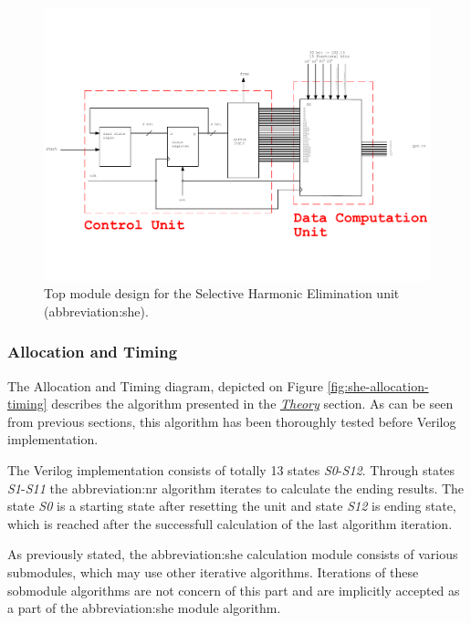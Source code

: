 \documentclass[a4paper, twoside, 11pt]{article}
\begin{document}
            \begin{figure}[htbp!]
                \centering
                \includegraphics[width=1\textwidth]{src/pdf/she-top-module.pdf}
                           \caption{Top module design for the Selective Harmonic Elimination unit (\gls{abbreviation:she}).}
                \label{fig:she-top-module}
            \end{figure}

    \FloatBarrier
        \subsubsection{Allocation and Timing}\label{sh:allocation-and-timing}
            The Allocation and Timing diagram, depicted on Figure \ref{fig:she-allocation-timing} describes the algorithm presented in the \hyperref[subsec:she-theory]{\textit{Theory}} section. As can be seen from previous sections, this algorithm has been thoroughly tested before Verilog implementation.\par
            The Verilog implementation consists of totally 13 states \textit{S0}-\textit{S12}. Through states \textit{S1}-\textit{S11} the \gls{abbreviation:nr} algorithm iterates to calculate the ending results. The state \textit{S0} is a starting state after resetting the unit and state \textit{S12} is ending state, which is reached after the successfull calculation of the last algorithm iteration.\par
            As previously stated, the \gls{abbreviation:she} calculation module consists of various submodules, which may use other iterative algorithms. Iterations of these sobmodule algorithms are not concern of this part and are implicitly accepted as a part of the \gls{abbreviation:she} module algorithm.
\end{document}
